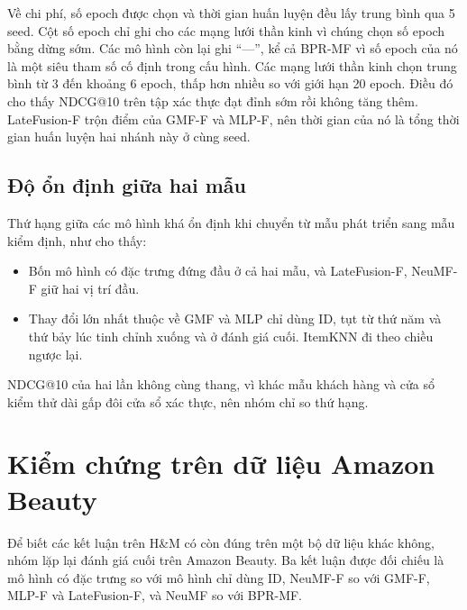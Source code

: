 Về chi phí, số epoch được chọn và thời gian huấn luyện đều lấy trung bình qua 5 seed. Cột số epoch chỉ ghi cho các mạng lưới thần kinh vì chúng chọn số epoch bằng dừng sớm. Các mô hình còn lại ghi ``---'', kể cả BPR-MF vì số epoch của nó là một siêu tham số cố định trong cấu hình. Các mạng lưới thần kinh chọn trung bình từ 3 đến khoảng 6 epoch, thấp hơn nhiều so với giới hạn 20 epoch. Điều đó cho thấy NDCG@10 trên tập xác thực đạt đỉnh sớm rồi không tăng thêm. LateFusion-F trộn điểm của GMF-F và MLP-F, nên thời gian của nó là tổng thời gian huấn luyện hai nhánh này ở cùng seed.


\subsection{Độ ổn định giữa hai mẫu}
\label{subsec:curves}

Thứ hạng giữa các mô hình khá ổn định khi chuyển từ mẫu phát triển sang mẫu kiểm định, như  cho thấy:
\begin{itemize}
    \item Bốn mô hình có đặc trưng đứng đầu ở cả hai mẫu, và LateFusion-F, NeuMF-F giữ hai vị trí đầu.
    \item Thay đổi lớn nhất thuộc về GMF và MLP chỉ dùng ID, tụt từ thứ năm và thứ bảy lúc tinh chỉnh xuống  và  ở đánh giá cuối. ItemKNN đi theo chiều ngược lại.
\end{itemize}

NDCG@10 của hai lần không cùng thang, vì khác mẫu khách hàng và cửa sổ kiểm thử dài gấp đôi cửa sổ xác thực, nên nhóm chỉ so thứ hạng.


\section{Kiểm chứng trên dữ liệu Amazon Beauty}
\label{sec:amazon_results}

Để biết các kết luận trên H\&M có còn đúng trên một bộ dữ liệu khác không, nhóm lặp lại đánh giá cuối trên Amazon Beauty. Ba kết luận được đối chiếu là mô hình có đặc trưng so với mô hình chỉ dùng ID, NeuMF-F so với GMF-F, MLP-F và LateFusion-F, và NeuMF so với BPR-MF.

